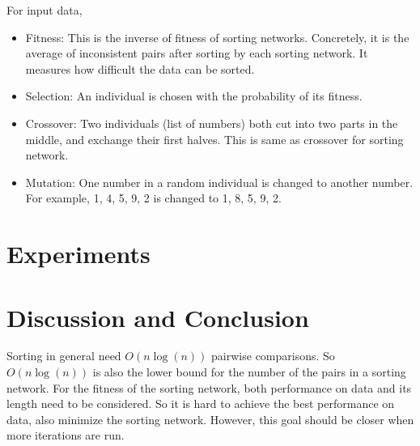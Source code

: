 \documentclass[11pt]{article}
\begin{document}
For input data,

\begin{itemize}
\item Fitness: This is the inverse of fitness of sorting networks.
Concretely, it is the average of inconsistent pairs after sorting by
each sorting network. It measures how difficult the data can
be sorted.

\item Selection: An individual is chosen with the probability of its
fitness.

\item Crossover: Two individuals (list of numbers) both cut into two
parts in the middle, and exchange their first halves. This is same as
crossover for sorting network.

\item Mutation: One number in a random individual is changed to
another number. For example, 1, 4, 5, 9, 2 is changed to 1, 8, 5, 9,
2.
\end{itemize}

\section{Experiments}

\section{Discussion and Conclusion}

Sorting in general need $O(n\log(n))$ pairwise comparisons. So
$O(n\log(n))$ is also the lower bound for the number of the pairs in
a sorting network. For the fitness of the sorting network, both
performance on data and its length need to be considered. So it is
hard to achieve the best performance on data, also minimize the
sorting network. However, this goal should be closer when more
iterations are run.
\end{document}
